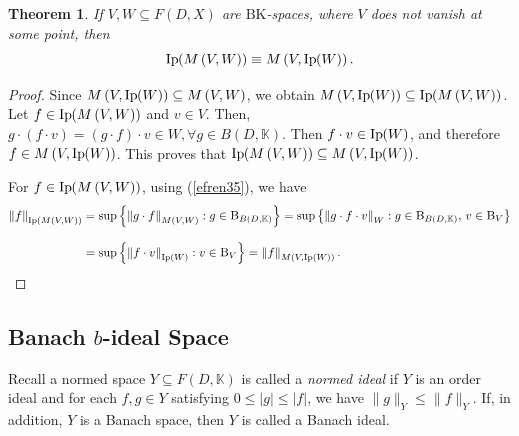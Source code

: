 \documentclass[14pt, a4paper]{article}  %
\providecommand{\llave}[1]{\left\lbrace #1\right\rbrace }
\providecommand{\pare}[1]{\left( #1\right) }
\providecommand{\norm}[1]{\left\lVert#1\right\rVert}
\newcommand{\K}{\mathbb{K}}
\newcommand{\BK}{\text{BK}}
\newcommand{\B}{\textup{B}}
\newtheorem{theorem}{Theorem}[section]
\begin{document}
	
	\begin{theorem}\label{lola166}
		If $V, W \subseteq F\pare{D, X}$ are $\BK$-spaces, where $V$ does not vanish at some point, then  
		\begin{equation}
			\textnormal{Ip}\hspace{-2pt}\pare{M\pare{V, W}} \equiv M\pare{V, \textnormal{Ip}\hspace{-2pt}\pare{W}}.
		\end{equation}
	\end{theorem}
	\begin{proof}  Since $M\pare{V, \text{Ip}\hspace{-2pt}\pare{W}} \subseteq M\pare{V, W}$, we obtain $M\pare{V, \text{Ip}\hspace{-2pt}\pare{W}} \subseteq \text{Ip}\hspace{-2pt}\pare{M\pare{V, W}}$.   Let $f \in \text{Ip}\hspace{-2pt}\pare{M\pare{V, W}}$ and $v \in V$. Then,  
		$ 
		g \cdot \pare{f \cdot v} = \pare{g \cdot f} \cdot v \in W,  \forall g \in B\pare{D, \K}.
		$  
		Then $f \cdot v \in \text{Ip}\hspace{-2pt}\pare{W}$, and therefore $f \in M\pare{V, \text{Ip}\hspace{-2pt}\pare{W}}$. This proves that $\text{Ip}\hspace{-2pt}\pare{M\pare{V, W}} \subseteq M\pare{V, \text{Ip}\hspace{-2pt}\pare{W}}$.  
		
		For $f \in \text{Ip}\hspace{-2pt}\pare{M\pare{V, W}}$, using (\ref{efren35}), we have  
		\begin{align*}
			\norm{f}_{\text{Ip}\hspace{-0pt}\pare{M\pare{V, W}}} &= \sup \llave{\norm{g \cdot f}_{M\pare{V, W}} : g \in \B_{B\pare{D, \K}}} = \sup \llave{\norm{g \cdot f \cdot v}_{W} : g \in \B_{B\pare{D, \K}}, \, v \in \B_{V}} \\[.3 cm]
			&= \sup \llave{\norm{f \cdot v}_{\text{Ip}\hspace{-0pt}\pare{W}} : v \in \B_{V}} = \norm{f}_{M\pare{V, \text{Ip}\hspace{-0pt}\pare{W}}}.\qedhere
		\end{align*}
	\end{proof}
	
	
	
	\subsection{Banach $b$-ideal Space}
		Recall a normed space $Y \subseteq F(D,\K)$ is called a \emph{normed ideal} if $Y$ is an order ideal  and for each $f ,g \in Y$  satisfying $0 \le |g| \le |f|$, we have  $\|g\|_Y \le \|f\|_Y$. If, in addition, $Y$ is a Banach space, then $Y$ is called a Banach ideal.
	
\end{document}
